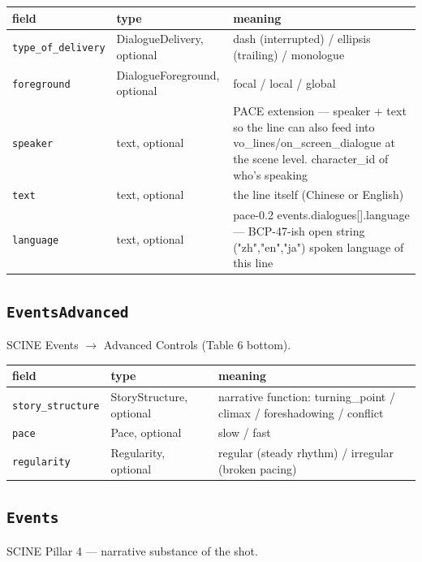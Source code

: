 \begin{longtable}{@{}R{0.24\textwidth}R{0.21\textwidth}R{0.49\textwidth}@{}}
\toprule \textbf{field} & \textbf{type} & \textbf{meaning} \\ \midrule
\endhead
\texttt{type\_\allowbreak of\_\allowbreak delivery} & DialogueDelivery, optional & dash (interrupted) /\allowbreak{} ellipsis (trailing) /\allowbreak{} monologue \\
\texttt{foreground} & DialogueForeground, optional & focal /\allowbreak{} local /\allowbreak{} global \\
\texttt{speaker} & text, optional & PACE extension ---\allowbreak{} speaker + text so the line can also feed into vo\_\allowbreak lines/\allowbreak{}on\_\allowbreak screen\_\allowbreak dialogue at the scene level. character\_\allowbreak id of who's speaking \\
\texttt{text} & text, optional & the line itself (Chinese or English) \\
\texttt{language} & text, optional & pace-0.2 events.dialogues[].language ---\allowbreak{} BCP-47-ish open string ("zh","en","ja") spoken language of this line \\
\bottomrule
\end{longtable}

\subsection*{\texttt{EventsAdvanced}}
\noindent SCINE Events $\to$ Advanced Controls (Table 6 bottom).

\begin{longtable}{@{}R{0.24\textwidth}R{0.21\textwidth}R{0.49\textwidth}@{}}
\toprule \textbf{field} & \textbf{type} & \textbf{meaning} \\ \midrule
\endhead
\texttt{story\_\allowbreak structure} & StoryStructure, optional & narrative function: turning\_\allowbreak point /\allowbreak{} climax /\allowbreak{} foreshadowing /\allowbreak{} conflict \\
\texttt{pace} & Pace, optional & slow /\allowbreak{} fast \\
\texttt{regularity} & Regularity, optional & regular (steady rhythm) /\allowbreak{} irregular (broken pacing) \\
\bottomrule
\end{longtable}

\subsection*{\texttt{Events}}
\noindent SCINE Pillar 4 ---\allowbreak{} narrative substance of the shot.

